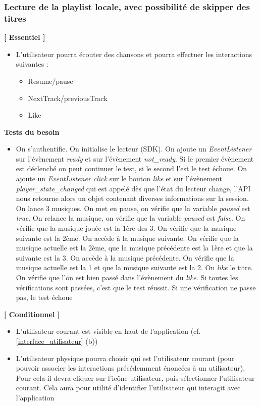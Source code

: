 \documentclass{article}
\begin{document}
		\subsubsection{Lecture de la playlist locale, avec possibilité de skipper des titres} \label{lecture}
		\textbf{[ Essentiel ]} 
		\begin{itemize}
			\item L'utilisateur pourra écouter des chansons et pourra effectuer les interactions suivantes :
			      \begin{itemize}
			      	\item Resume/pause
			      	\item NextTrack/previousTrack
			      	\item Like
			      \end{itemize}
		\end{itemize}
		\textbf{Tests du besoin}
		\begin{itemize}
			\item On s’authentifie. On initialise le lecteur (SDK). On ajoute un \textit{EventListener} sur l'évènement \textit{ready} et sur l'évènement \textit{not\_ready}. Si le premier évènement est déclenché on peut continuer le test, si le second l'est le test échoue. On ajoute un \textit{EventListener click} sur le bouton \textit{like} et sur l'évènement \textit{player\_state\_changed} qui est appelé dès que l'état du lecteur change, l'API nous retourne alors un objet contenant diverses informations sur la session. On lance 3 musiques. On met en pause, on vérifie que la variable \textit{paused} est \textit{true}. On relance la musique, on vérifie que la variable \textit{paused} est \textit{false}. On vérifie que la musique jouée est la 1ère des 3. On vérifie que la musique suivante est la 2ème. On accède à la musique suivante. On vérifie que la musique actuelle est la 2ème, que la musique précédente est la 1ère et que la suivante est la 3. On accède à la musique précédente. On vérifie que la musique actuelle est la 1 et que la musique suivante est la 2. On  \textit{like} le titre. On vérifie que l'on est bien passé dans l'évènement du \textit{like}. Si toutes les vérifications sont passées, c'est que le test réussit. Si une vérification ne passe pas, le test échoue
		\end{itemize}
		\textbf{[ Conditionnel ]}
		\begin{itemize}
			\item L'utilisateur courant est visible en haut de l'application (cf. \ref{interface_utilisateur} (b)) 
			\item L'utilisateur physique pourra choisir qui est l'utilisateur courant (pour pouvoir associer les interactions précédemment énoncées à un utilisateur). Pour cela il devra cliquer sur l'icône utilisateur, puis sélectionner l'utilisateur courant. Cela aura pour utilité d'identifier l'utilisateur qui interagit avec l'application
		\end{itemize}
\end{document}
